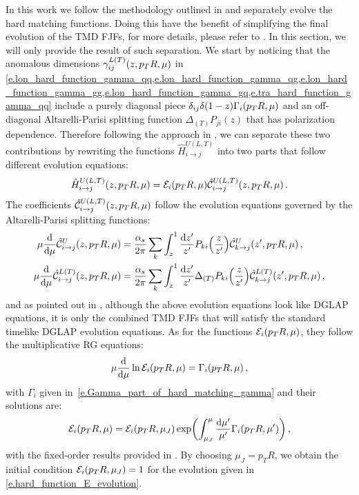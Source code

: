 \documentclass[a4paper, 11 pt]{article}
\begin{document}
In this work we follow the methodology outlined in \cite{Kang:2017glf} and separately evolve the hard matching functions.
Doing this have the benefit of simplifying the final evolution of the TMD FJFs, for more details, please refer to \cite{Kang:2017glf}.
In this section, we will only provide the result of such separation.
We start by noticing that the anomalous dimensions $\gamma_{i j}^{L(T)} \pqty{z, p_TR, \mu}$ in \cref{e.lon_hard_function_gamma_qq,e.lon_hard_function_gamma_qg,e.lon_hard_function_gamma_gg,e.lon_hard_function_gamma_gq,e.tra_hard_function_gamma_qq} include a purely diagonal piece $\delta _{ij} \delta (1-z) \Gamma _i \pqty{p_TR, \mu}$ and an off-diagonal Altarelli-Parisi splitting function $\Delta _{(T)} P_{ji}(z)$ that has polarization dependence.
Therefore following the approach in \cite{Kang:2017glf}, we can separate these two contributions by rewriting the functions $\hat{H}^{U (L, T)}_{i \rightarrow j}$ into two parts that follow different evolution equations:
\begin{equation}
\hat{H}^{U (L, T)}_{i \rightarrow j} \pqty{z, p_TR, \mu}
=
\mathcal{E}_i \pqty{p_TR, \mu}
\hat{\mathcal{C}}^{U (L, T)}_{i \rightarrow j} \pqty{z, p_TR, \mu}
\, . \label{e.hard_function_separation}
\end{equation}
The coefficients $\hat{\mathcal{C}}^{U (L, T)}_{i \rightarrow j} \pqty{z, p_TR, \mu}$ follow the evolution equations governed by the Altarelli-Parisi splitting functions:
\begin{align}
\mu \frac{\dd{}}{\dd{\mu}} \hat{\mathcal{C}}^{U}_{i \rightarrow j} \pqty{z, p_TR, \mu}
& =
\frac{\alpha _s}{2 \pi} \sum _k \int _z^1 \frac{\dd{z'}}{z'} 
P_{k i} \pqty{\frac{z}{z'}}\hat{\mathcal{C}}^{U}_{k \rightarrow j} \pqty{z', p_TR, \mu}
\, , \\
\mu \frac{\dd{}}{\dd{\mu}} \hat{\mathcal{C}}^{L(T)}_{i \rightarrow j} \pqty{z, p_TR, \mu}
& =
\frac{\alpha _s}{2 \pi} \sum _k \int _z^1 \frac{\dd{z'}}{z'} 
\Delta _{(T)} P_{k i} \pqty{\frac{z}{z'}}
\hat{\mathcal{C}}^{L(T)}_{k \rightarrow j} \pqty{z', p_TR, \mu}
\, , \label{e.hard_function_evolution}
\end{align}
and as pointed out in \cite{Kang:2017glf}, although the above evolution equations look like DGLAP equations, it is only the combined TMD FJFs that will satisfy the standard timelike DGLAP evolution equations.
As for the functions $\mathcal{E}_i \pqty{p_TR, \mu}$, they follow the multiplicative RG equations:
\begin{equation} \label{e.hard_function_E_evolution}
\mu \frac{\dd{}}{\dd{\mu}} \ln{\mathcal{E}_i \pqty{p_TR, \mu}}
=
\Gamma _i \pqty{p_TR, \mu}
\, ,
\end{equation}
with $\Gamma_i$ given in~\cref{e.Gamma_part_of_hard_matching_gamma} and their solutions are:
\begin{equation}
\mathcal{E}_i \pqty{p_TR, \mu}
=
\mathcal{E}_i \pqty{p_TR, \mu _J}
\exp(\int _{\mu _J}^{\mu} \frac{\dd{\mu'}}{\mu'} 
\Gamma _i \pqty{p_TR, \mu'})
\, ,
\end{equation}
with the fixed-order results provided in \cite{Kang:2017glf}.
By choosing $\mu _J = p_T R$, we obtain the initial condition $\mathcal{E}_i \pqty{p_TR, \mu_J} = 1$ for the evolution given in \cref{e.hard_function_E_evolution}.
\end{document}
